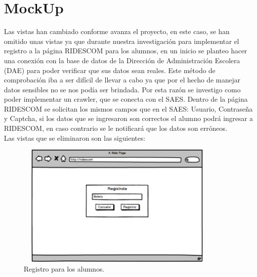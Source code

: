 	
	

	\section{MockUp}
	\noindent Las vistas han cambiado conforme avanza el proyecto, en este caso, se han omitido unas vistas ya que durante nuestra investigación para implementar el registro a la página RIDESCOM para los alumnos, en un inicio se planteo hacer una conexión con la base de datos de la Dirección de Administración Escolera (DAE) para poder verificar que sus datos sean reales. Este método de comprobación iba a ser difícil de llevar a cabo ya que por el hecho de manejar datos sensibles no se nos podía ser brindada. Por esta razón se investigo como poder implementar un crawler, que se conecta con el SAES. Dentro de la página RIDESCOM se solicitan los mismos campos que en el SAES: Usuario, Contraseña y Captcha, si los datos que se ingresaron son correctos el alumno podrá ingresar a RIDESCOM, en caso contrario se le notificará que los datos son erróneos. \\
	Las vistas que se eliminaron son las siguientes: 
	
	\begin{figure}[hbt!]
		\centering
		\includegraphics[width=10cm, height=6cm]{Imagenes/Disenos/VistasBorradas/p1_Registro.png}
		\caption{Registro para los alumnos.}
	\end{figure}
	
